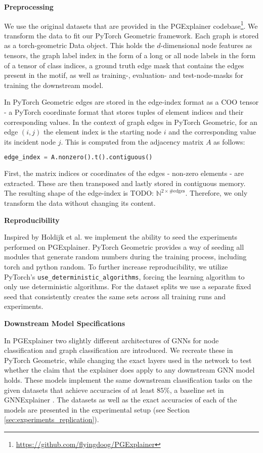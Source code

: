 \textbf{Preprocessing}\par
 We use the original datasets that are provided in the PGExplainer codebase\footnote{\url{https://github.com/flyingdoog/PGExplainer}}. We transform the data to fit our PyTorch Geometric framework. Each graph is stored as a torch-geometric Data object. This holds the $d$-dimensional node features as tensors, the graph label index in the form of a long or all node labels in the form of a tensor of class indices, a ground truth edge mask that contains the edges present in the motif, as well as training-, evaluation- and test-node-masks for training the downstream model. 
 
 In PyTorch Geometric edges are stored in the edge-index format as a COO tensor - a PyTorch coordinate format that stores tuples of element indices and their corresponding values. In the context of graph edges in PyTorch Geometric, for an edge $(i,j)$ the element index is the starting node $i$ and the corresponding value its incident node $j$. This is computed from the adjacency matrix $A$ as follows:
\begin{lstlisting}[language=Python, caption=Edge index transformation, label=lst:edge_index]
    edge_index = A.nonzero().t().contiguous()
\end{lstlisting}
First, the matrix indices or coordinates of the edges - non-zero elements - are extracted. These are then transposed and lastly stored in contiguous memory. The resulting shape of the edge-index is TODO: $\mathbb{N}^{2\times \text{\#edges}}$. Therefore, we only transform the data without changing its content. \bigskip

\textbf{Reproducibility}\par
 Inspired by Holdijk et al. \cite{holdijk2021re} we implement the ability to seed the experiments performed on PGExplainer. PyTorch Geometric provides a way of seeding all modules that generate random numbers during the training process, including torch and python random.
To further increase reproducibility, we utilize PyTorch's \lstinline|use_deterministic_algorithms|, forcing the learning algorithm to only use deterministic algorithms. For the dataset splits we use a separate fixed seed that consistently creates the same sets across all training runs and experiments.\bigskip

\textbf{Downstream Model Specifications}\par
 In PGExplainer two slightly different architectures of GNNs for node classification and graph classification are introduced. We recreate these in PyTorch Geometric, while changing the exact layers used in the network to test whether the claim that the explainer does apply to any downstream GNN model holds. These models implement the same downstream classification tasks on the given datasets that achieve accuracies of at least $85\%$, a baseline set in GNNExplainer \cite{ying2019gnnexplainer}. The datasets as well as the exact accuracies of each of the models are presented in the experimental setup (see Section \ref{sec:experiments_replication}). 

